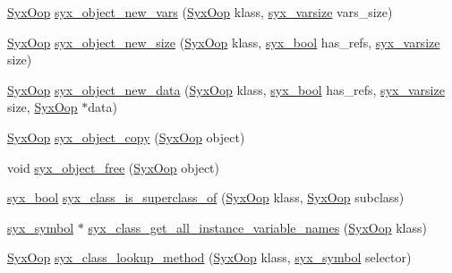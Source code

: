 \begin{CompactItemize}
\item 
\hyperlink{syx-types_8h_1121caba2d40b2ce090b640762744ccd}{SyxOop} \hyperlink{syx-object_8c_f94f2c1c65aaf0962fbcc022519e189a}{syx\_\-object\_\-new\_\-vars} (\hyperlink{syx-types_8h_1121caba2d40b2ce090b640762744ccd}{SyxOop} klass, \hyperlink{syx-types_8h_18e1a1417591a1efb670b97ce320f535}{syx\_\-varsize} vars\_\-size)
\item 
\hyperlink{syx-types_8h_1121caba2d40b2ce090b640762744ccd}{SyxOop} \hyperlink{syx-object_8c_33e2745b5769c0bf58d0e761019c719a}{syx\_\-object\_\-new\_\-size} (\hyperlink{syx-types_8h_1121caba2d40b2ce090b640762744ccd}{SyxOop} klass, \hyperlink{syx-types_8h_c6dc09b276b99fa1956364359139daab}{syx\_\-bool} has\_\-refs, \hyperlink{syx-types_8h_18e1a1417591a1efb670b97ce320f535}{syx\_\-varsize} size)
\item 
\hyperlink{syx-types_8h_1121caba2d40b2ce090b640762744ccd}{SyxOop} \hyperlink{syx-object_8c_fd74facabd8919359e6b26cbb0e10277}{syx\_\-object\_\-new\_\-data} (\hyperlink{syx-types_8h_1121caba2d40b2ce090b640762744ccd}{SyxOop} klass, \hyperlink{syx-types_8h_c6dc09b276b99fa1956364359139daab}{syx\_\-bool} has\_\-refs, \hyperlink{syx-types_8h_18e1a1417591a1efb670b97ce320f535}{syx\_\-varsize} size, \hyperlink{syx-types_8h_1121caba2d40b2ce090b640762744ccd}{SyxOop} $\ast$data)
\item 
\hyperlink{syx-types_8h_1121caba2d40b2ce090b640762744ccd}{SyxOop} \hyperlink{syx-object_8c_87ae9f3c62c6c608d8d0c854067048a1}{syx\_\-object\_\-copy} (\hyperlink{syx-types_8h_1121caba2d40b2ce090b640762744ccd}{SyxOop} object)
\item 
void \hyperlink{syx-object_8c_5f525b9cf7e1db14135a63a6d11e1acd}{syx\_\-object\_\-free} (\hyperlink{syx-types_8h_1121caba2d40b2ce090b640762744ccd}{SyxOop} object)
\item 
\hyperlink{syx-types_8h_c6dc09b276b99fa1956364359139daab}{syx\_\-bool} \hyperlink{syx-object_8c_973315a5004f9f3e788e8f7e6fd3a183}{syx\_\-class\_\-is\_\-superclass\_\-of} (\hyperlink{syx-types_8h_1121caba2d40b2ce090b640762744ccd}{SyxOop} klass, \hyperlink{syx-types_8h_1121caba2d40b2ce090b640762744ccd}{SyxOop} subclass)
\item 
\hyperlink{syx-types_8h_9663af54b7b72f5d8be5f754ef356525}{syx\_\-symbol} $\ast$ \hyperlink{syx-object_8c_74f615d1e149a01f1e825aa33f3bf9c4}{syx\_\-class\_\-get\_\-all\_\-instance\_\-variable\_\-names} (\hyperlink{syx-types_8h_1121caba2d40b2ce090b640762744ccd}{SyxOop} klass)
\item 
\hyperlink{syx-types_8h_1121caba2d40b2ce090b640762744ccd}{SyxOop} \hyperlink{syx-object_8c_0dfdb8f628bc53241e404e0a7a0c1004}{syx\_\-class\_\-lookup\_\-method} (\hyperlink{syx-types_8h_1121caba2d40b2ce090b640762744ccd}{SyxOop} klass, \hyperlink{syx-types_8h_9663af54b7b72f5d8be5f754ef356525}{syx\_\-symbol} selector)

\end{CompactItemize}
